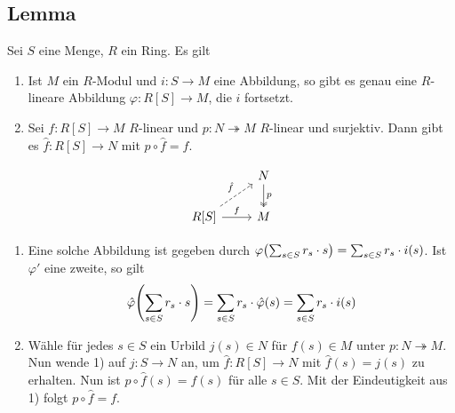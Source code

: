 \subsection[Lemma: Universale Eigenschaft von freien Moduln]{Lemma} %
\label{sub:32}
Sei $S$ eine Menge, $R$ ein Ring. Es gilt\\
\begin{minipage}{0.7\textwidth}
	\begin{enumerate}[1)]
		\item Ist $M$ ein $R$-Modul und $i : S \to M$ eine Abbildung, so gibt es genau eine $R$-lineare Abbildung $\varphi : R[S] \to M$, die $i$ fortsetzt.
		\item Sei $f : R[S] \to M$ $R$-linear und $p : N \twoheadrightarrow M$ $R$-linear und surjektiv. Dann gibt es $\hat{f} : R[S] \to N$ mit $p \circ \hat{f} =f$.
	\end{enumerate}
\end{minipage}\hfill
\begin{minipage}{0.25\textwidth}
	\[
		\begin{tikzcd}
			\mbox{ } & N \dar["p", two heads] \\
			R[S] \rar["f"] \urar["\hat{f}", dashed] & M
		\end{tikzcd}
	\]
\end{minipage}
\begin{enumerate}[1)]
	\item Eine solche Abbildung ist gegeben durch
	\(
		\varphi \enbrace*{\sum_{s \in S} r_s \cdot s} = \sum_{s \in S} r_s \cdot i(s)
	\).
	Ist $\varphi'$ eine zweite, so gilt 
	\begin{align*}
		\hat{\varphi} \enbrace*{\sum_{s \in S} r_s \cdot s}  = \sum_{s \in S} r_s \cdot \hat{\varphi}(s) = \sum_{s  \in S} r_s \cdot i(s)
	\end{align*}
	\item Wähle für jedes $s \in S$ ein Urbild $j(s)\in N$ für $f(s) \in M$ unter $p : N \twoheadrightarrow M$. Nun wende 1) auf $j : S \to N$ an, um $\hat{f} : R[S] \to N$
	mit $\hat{f}(s) = j(s)$ zu erhalten. Nun ist $ p \circ \hat{f}(s) = f(s)$ für alle $s \in S$. Mit der Eindeutigkeit aus 1) folgt $p \circ \hat{f} = f$. \bewende
\end{enumerate}

